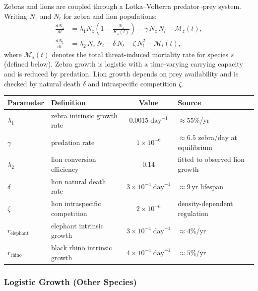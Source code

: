 Zebras and lions are coupled through a Lotka--Volterra predator--prey system. Writing $N_z$ and $N_l$ for zebra and lion populations:
\begin{align}
\frac{dN_z}{dt} &= \lambda_1 N_z\!\left(1 - \frac{N_z}{K_z(t)}\right) - \gamma\, N_z\, N_l - \mathcal{M}_z(t), \label{eq:zebra} \\[6pt]
\frac{dN_l}{dt} &= \lambda_2\, N_z\, N_l - \delta\, N_l - \zeta\, N_l^2 - \mathcal{M}_l(t), \label{eq:lion}
\end{align}
where $\mathcal{M}_s(t)$ denotes the total threat-induced mortality rate for species $s$ (defined below). Zebra growth is logistic with a time-varying carrying capacity and is reduced by predation. Lion growth depends on prey availability and is checked by natural death $\delta$ and intraspecific competition $\zeta$.

\begin{center}
\begin{tabular}{l l c l}
\hline
\textbf{Parameter} & \textbf{Definition} & \textbf{Value} & \textbf{Source} \\
\hline
$\lambda_1$ & zebra intrinsic growth rate & $0.0015\;\text{day}^{-1}$ & $\approx 55\%$/yr \cite{gaillard2000dynamics} \\
$\gamma$ & predation rate & $1 \times 10^{-6}$ & $\approx 6.5$ zebra/day at equilibrium \cite{hayward2005prey} \\
$\lambda_2$ & lion conversion efficiency & 0.14 & fitted to observed lion growth \cite{stander1991demography} \\
$\delta$ & lion natural death rate & $3 \times 10^{-4}\;\text{day}^{-1}$ & $\approx 9$\,yr lifespan \cite{barthold2016lion} \\
$\zeta$ & lion intraspecific competition & $2 \times 10^{-6}$ & density-dependent regulation \cite{kissui2004lions} \\
$r_{\text{elephant}}$ & elephant intrinsic growth & $3 \times 10^{-4}\;\text{day}^{-1}$ & $\approx 4\%$/yr \cite{calef1988elephant} \\
$r_{\text{rhino}}$ & black rhino intrinsic growth & $4 \times 10^{-4}\;\text{day}^{-1}$ & $\approx 5\%$/yr \cite{emslie1999rhino} \\
\hline
\end{tabular}
\end{center}

\subsubsection{Logistic Growth (Other Species)}

